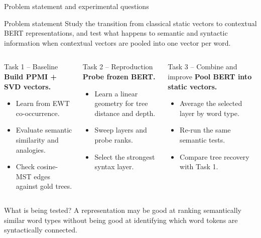 \documentclass[aspectratio=169,9pt]{beamer}
\newcommand{\tightitem}{\setlength{\itemsep}{0.14em}\setlength{\parskip}{0pt}}
\begin{document}
\begin{frame}{Problem statement and experimental questions}
\begin{block}{Problem statement}
Study the transition from classical static vectors to contextual BERT representations, and test what happens to semantic and syntactic information when contextual vectors are pooled into one vector per word.
\end{block}
\vspace{0.15em}
\begin{columns}[T,onlytextwidth]
  \begin{block}{Task 1 -- Baseline}
    \textbf{Build PPMI + SVD vectors.}
    \begin{itemize}\tightitem
      \item Learn from EWT co-occurrence.
      \item Evaluate semantic similarity and analogies.
      \item Check cosine-MST edges against gold trees.
    \end{itemize}
  \end{block}
  \begin{block}{Task 2 -- Reproduction}
    \textbf{Probe frozen BERT.}
    \begin{itemize}\tightitem
      \item Learn a linear geometry for tree distance and depth.
      \item Sweep layers and probe ranks.
      \item Select the strongest syntax layer.
    \end{itemize}
  \end{block}
  \begin{block}{Task 3 -- Combine and improve}
    \textbf{Pool BERT into static vectors.}
    \begin{itemize}\tightitem
      \item Average the selected layer by word type.
      \item Re-run the same semantic tests.
      \item Compare tree recovery with Task 1.
    \end{itemize}
  \end{block}
\end{columns}
\vspace{0.18em}
\begin{exampleblock}{What is being tested?}
A representation may be good at ranking semantically similar word types without being good at identifying which word tokens are syntactically connected.
\end{exampleblock}
\end{frame}
\end{document}
